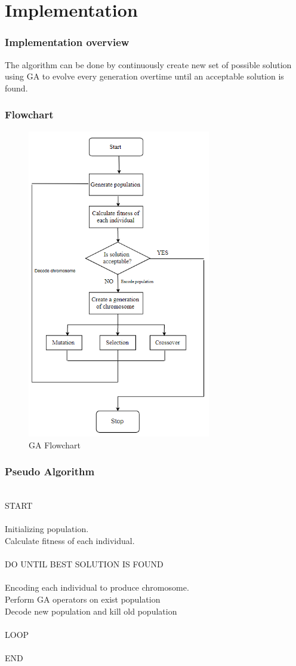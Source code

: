 \documentclass[conference]{IEEEtran}
\begin{document}
\section{Implementation}
\subsubsection{Implementation overview}
\indent The algorithm can be done by continuously create new set of possible solution using GA to evolve every generation overtime until an acceptable solution is found.\\

\subsubsection{Flowchart}
\indent
\begin{figure}[H]
    \centering
    \includegraphics[width=8cm]{flowchart}
    \caption{GA Flowchart}
    \label{fig:fig5}
\end{figure}
\subsubsection{Pseudo Algorithm}
~\\
START\\ \\
Initializing population.\\
Calculate fitness of each individual.\\ \\
DO UNTIL BEST SOLUTION IS FOUND\\ \\
\indent	Encoding each individual to produce chromosome.\\
\indent Perform GA operators on exist population\\
\indent Decode new population and kill old population\\ \\
LOOP\\ \\
END\\ 
\end{document}
